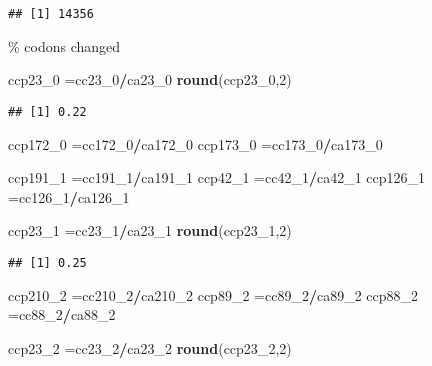 \documentclass[
]{article}
\newenvironment{Shaded}{\begin{snugshade}}{\end{snugshade}}
\newcommand{\DecValTok}[1]{\textcolor[rgb]{0.00,0.00,0.81}{#1}}
\newcommand{\KeywordTok}[1]{\textcolor[rgb]{0.13,0.29,0.53}{\textbf{#1}}}
\newcommand{\NormalTok}[1]{#1}
\newcommand{\OperatorTok}[1]{\textcolor[rgb]{0.81,0.36,0.00}{\textbf{#1}}}
\begin{document}
\begin{verbatim}
## [1] 14356
\end{verbatim}

\% codons changed

\begin{Shaded}
\begin{Highlighting}[]
\NormalTok{ccp23_}\DecValTok{0}\NormalTok{ =cc23_}\DecValTok{0}\OperatorTok{/}\NormalTok{ca23_}\DecValTok{0}
\KeywordTok{round}\NormalTok{(ccp23_}\DecValTok{0}\NormalTok{,}\DecValTok{2}\NormalTok{)}
\end{Highlighting}
\end{Shaded}

\begin{verbatim}
## [1] 0.22
\end{verbatim}

\begin{Shaded}
\begin{Highlighting}[]
\NormalTok{ccp172_}\DecValTok{0}\NormalTok{ =cc172_}\DecValTok{0}\OperatorTok{/}\NormalTok{ca172_}\DecValTok{0}
\NormalTok{ccp173_}\DecValTok{0}\NormalTok{ =cc173_}\DecValTok{0}\OperatorTok{/}\NormalTok{ca173_}\DecValTok{0}

\NormalTok{ccp191_}\DecValTok{1}\NormalTok{ =cc191_}\DecValTok{1}\OperatorTok{/}\NormalTok{ca191_}\DecValTok{1}
\NormalTok{ccp42_}\DecValTok{1}\NormalTok{ =cc42_}\DecValTok{1}\OperatorTok{/}\NormalTok{ca42_}\DecValTok{1}
\NormalTok{ccp126_}\DecValTok{1}\NormalTok{ =cc126_}\DecValTok{1}\OperatorTok{/}\NormalTok{ca126_}\DecValTok{1}

\NormalTok{ccp23_}\DecValTok{1}\NormalTok{ =cc23_}\DecValTok{1}\OperatorTok{/}\NormalTok{ca23_}\DecValTok{1}
\KeywordTok{round}\NormalTok{(ccp23_}\DecValTok{1}\NormalTok{,}\DecValTok{2}\NormalTok{)}
\end{Highlighting}
\end{Shaded}

\begin{verbatim}
## [1] 0.25
\end{verbatim}

\begin{Shaded}
\begin{Highlighting}[]
\NormalTok{ccp210_}\DecValTok{2}\NormalTok{ =cc210_}\DecValTok{2}\OperatorTok{/}\NormalTok{ca210_}\DecValTok{2}
\NormalTok{ccp89_}\DecValTok{2}\NormalTok{ =cc89_}\DecValTok{2}\OperatorTok{/}\NormalTok{ca89_}\DecValTok{2}
\NormalTok{ccp88_}\DecValTok{2}\NormalTok{ =cc88_}\DecValTok{2}\OperatorTok{/}\NormalTok{ca88_}\DecValTok{2}

\NormalTok{ccp23_}\DecValTok{2}\NormalTok{ =cc23_}\DecValTok{2}\OperatorTok{/}\NormalTok{ca23_}\DecValTok{2}
\KeywordTok{round}\NormalTok{(ccp23_}\DecValTok{2}\NormalTok{,}\DecValTok{2}\NormalTok{)}
\end{Highlighting}
\end{Shaded}
\end{document}
